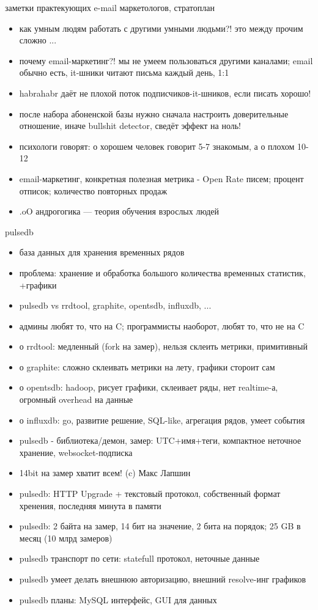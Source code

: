 \documentclass[aspectratio=169]{beamer}
\begin{document}
\begin{frame}{заметки практекующих e-mail маркетологов, стратоплан}
\begin{itemize}
  \item как умным людям работать с другими умными людьми?! это между прочим сложно ...
  \item почему email-маркетинг?! мы не умеем пользоваться другими каналами; email обычно есть, it-шники читают письма каждый день, 1:1
  \item habrahabr даёт не плохой поток подписчиков-it-шников, если писать хорошо!
  \item после набора абоненской базы нужно сначала настроить доверительные отношение, иначе bullshit detector, сведёт эффект на ноль!
  \item психологи говорят: о хорошем человек говорит 5-7 знакомым, а о плохом 10-12
  \item email-маркетинг, конкретная полезная метрика - Open Rate писем; процент отписок; количество повторных продаж
  \item .oO андрогогика --- теория обучения взрослых людей
\end{itemize}
\end{frame}

\begin{frame}{pulsedb}
\begin{itemize}
  \item база данных для хранения временных рядов
  \item проблема: хранение и обработка большого количества временных статистик, +графики
  \item pulsedb vs rrdtool, graphite, opentsdb, influxdb, ...
  \item админы любят то, что на C; программисты наоборот, любят то, что не на C
  \item о rrdtool: медленный (fork на замер), нельзя склеить метрики, примитивный
  \item о graphite: сложно склеивать метрики на лету, графики стороит сам
  \item о opentsdb: hadoop, рисует графики, склеивает ряды, нет realtime-а, огромный overhead на данные
  \item о influxdb: go, развитие решение, SQL-like, агрегация рядов, умеет события
  \item pulsedb - библиотека/демон, замер: UTC+имя+теги, компактное неточное хранение, websocket-подписка
  \item 14bit на замер хватит всем! (c) Макс Лапшин
  \item pulsedb: HTTP Upgrade + текстовый протокол, собственный формат хренения, последняя минута в памяти
  \item pulsedb: 2 байта на замер, 14 бит на значение, 2 бита на порядок; 25 GB в месяц (10 млрд замеров)
  \item pulsedb транспорт по сети: statefull протокол, неточные данные
  \item pulsedb умеет делать внешнюю авторизацию, внешний resolve-инг графиков
  \item pulsedb планы: MySQL интерфейс, GUI для данных
\end{itemize}
\end{frame}
\end{document}
